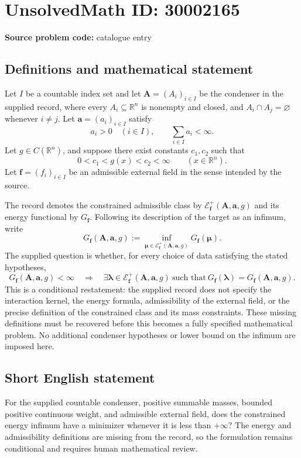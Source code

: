 \documentclass[11pt]{article}
\newcommand{\R}{\mathbb{R}}
\begin{document}
\section*{UnsolvedMath ID: 30002165}
\textbf{Source problem code:} catalogue entry
\subsection{Definitions and mathematical statement}
Let \(I\) be a countable index set and let \(\mathbf A=(A_i)_{i\in I}\) be the condenser in the supplied record, where every \(A_i\subseteq\R^n\) is nonempty and closed, and \(A_i\cap A_j=\varnothing\) whenever \(i\ne j\). Let \(\mathbf a=(a_i)_{i\in I}\) satisfy
\[
 a_i>0\quad(i\in I),\qquad \sum_{i\in I}a_i<\infty.
\]
Let \(g\in C(\R^n)\), and suppose there exist constants \(c_1,c_2\) such that
\[
 0<c_1<g(x)<c_2<\infty\qquad(x\in\R^n).
\]
Let \(\mathbf f=(f_i)_{i\in I}\) be an admissible external field in the sense intended by the source.

The record denotes the constrained admissible class by \(\mathcal E_{\mathbf f}^+(\mathbf A,\mathbf a,g)\) and its energy functional by \(G_{\mathbf f}\). Following its description of the target as an infimum, write
\[
 G_{\mathbf f}(\mathbf A,\mathbf a,g)
 :=\inf_{\boldsymbol\mu\in\mathcal E_{\mathbf f}^+(\mathbf A,\mathbf a,g)}
 G_{\mathbf f}(\boldsymbol\mu).
\]
The supplied question is whether, for every choice of data satisfying the stated hypotheses,
\[
 G_{\mathbf f}(\mathbf A,\mathbf a,g)<\infty
 \quad\Longrightarrow\quad
 \exists\boldsymbol\lambda\in\mathcal E_{\mathbf f}^+(\mathbf A,\mathbf a,g)
 \ \text{such that}\ 
 G_{\mathbf f}(\boldsymbol\lambda)
 =G_{\mathbf f}(\mathbf A,\mathbf a,g).
\]
This is a conditional restatement: the supplied record does not specify the interaction kernel, the energy formula, admissibility of the external field, or the precise definition of the constrained class and its mass constraints. These missing definitions must be recovered before this becomes a fully specified mathematical problem. No additional condenser hypotheses or lower bound on the infimum are imposed here.
\subsection{Short English statement}
For the supplied countable condenser, positive summable masses, bounded positive continuous weight, and admissible external field, does the constrained energy infimum have a minimizer whenever it is less than \(+\infty\)? The energy and admissibility definitions are missing from the record, so the formulation remains conditional and requires human mathematical review.
\end{document}
